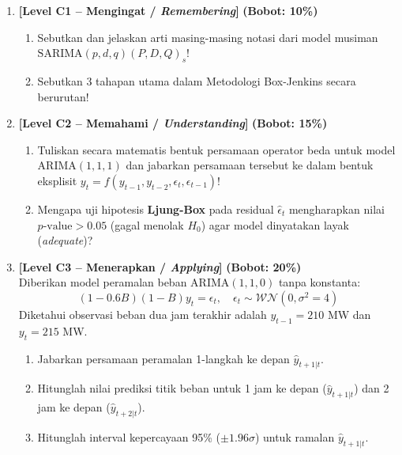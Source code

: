 \documentclass[11pt,a4paper]{article}
\begin{document}
\begin{enumerate}[leftmargin=1.5em, label=\textbf{Soal \arabic*.}]

    \item \textbf{[Level C1 -- Mengingat / \textit{Remembering}]} \hfill \textbf{(Bobot: 10\%)}
    \begin{enumerate}[label=\alph*.]
        \item Sebutkan dan jelaskan arti masing-masing notasi dari model musiman $\text{SARIMA}(p,d,q)(P,D,Q)_s$!
        \item Sebutkan 3 tahapan utama dalam Metodologi Box-Jenkins secara berurutan!
    \end{enumerate}

    \vspace{0.3cm}

    \item \textbf{[Level C2 -- Memahami / \textit{Understanding}]} \hfill \textbf{(Bobot: 15\%)}
    \begin{enumerate}[label=\alph*.]
        \item Tuliskan secara matematis bentuk persamaan operator beda untuk model $\text{ARIMA}(1,1,1)$ dan jabarkan persamaan tersebut ke dalam bentuk eksplisit $y_t = f(y_{t-1}, y_{t-2}, \epsilon_t, \epsilon_{t-1})$!
        \item Mengapa uji hipotesis \textbf{Ljung-Box} pada residual $\hat{\epsilon}_t$ mengharapkan nilai $p\text{-value} > 0.05$ (gagal menolak $H_0$) agar model dinyatakan layak (\textit{adequate})?
    \end{enumerate}

    \vspace{0.3cm}

    \item \textbf{[Level C3 -- Menerapkan / \textit{Applying}]} \hfill \textbf{(Bobot: 20\%)} \\
    Diberikan model peramalan beban $\text{ARIMA}(1,1,0)$ tanpa konstanta:
    \begin{equation*}
        (1 - 0.6B)(1 - B)y_t = \epsilon_t, \quad \epsilon_t \sim \mathcal{WN}(0, \sigma^2 = 4)
    \end{equation*}
    Diketahui observasi beban dua jam terakhir adalah $y_{t-1} = 210$ MW dan $y_t = 215$ MW.
    \begin{enumerate}[label=\alph*.]
        \item Jabarkan persamaan peramalan 1-langkah ke depan $\hat{y}_{t+1|t}$.
        \item Hitunglah nilai prediksi titik beban untuk 1 jam ke depan ($\hat{y}_{t+1|t}$) dan 2 jam ke depan ($\hat{y}_{t+2|t}$).
        \item Hitunglah interval kepercayaan 95\% ($\pm 1.96 \sigma$) untuk ramalan $\hat{y}_{t+1|t}$.
    \end{enumerate}


\end{enumerate}
\end{document}
